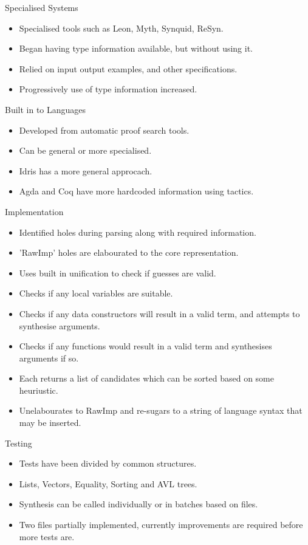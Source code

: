 \documentclass[presentation]{beamer}
\begin{document}
\begin{frame}[fragile]{Specialised Systems}
  \begin{itemize}
  \item Specialised tools such as Leon, Myth, Synquid, ReSyn.
  \item Began having type information available, but without using it.
  \item Relied on input output examples, and other specifications. 
  \item Progressively use of type information increased.
  \end{itemize}
\end{frame}

\begin{frame}[fragile]{Built in to Languages}
  \begin{itemize}
  \item Developed from automatic proof search tools.
  \item Can be general or more specialised.
  \item Idris has a more general approcach.
  \item Agda and Coq have more hardcoded information using tactics.
  \end{itemize}
\end{frame}
\begin{frame}[fragile]{Implementation}
  \begin{itemize}
  \item Identified holes during parsing along with required information.
  \item 'RawImp' holes are elabourated to the core representation.
  \item Uses built in unification to check if guesses are valid.
  \item Checks if any local variables are suitable.
  \item Checks if any data constructors will
    result in a valid term, and attempts to synthesise arguments.
  \item Checks if any functions would result in a valid term and
    synthesises arguments if so.
  \item Each returns a list of candidates which can be sorted based on some
    heuriustic.
  \item Unelabourates to RawImp and re-sugars to a string of
    language syntax that may be inserted.
  \end{itemize}
\end{frame}

\begin{frame}[fragile]{Testing}
  \begin{itemize}
  \item Tests have been divided by common structures.
  \item Lists, Vectors, Equality, Sorting and AVL trees.
  \item Synthesis can be called individually or in batches based
    on files.
  \item Two files partially implemented, currently improvements
    are required before more tests are.
  \end{itemize}
\end{frame}
\end{document}
